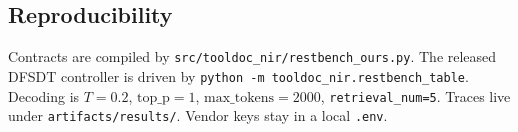 \documentclass[11pt,a4paper]{article}
\begin{document}
\subsection{Reproducibility}

Contracts are compiled by \texttt{src/tooldoc\_nir/restbench\_ours.py}.
The released DFSDT controller is driven by \texttt{python -m tooldoc\_nir.restbench\_table}.
Decoding is $T{=}0.2$, $\mathrm{top\_p}{=}1$, $\mathrm{max\_tokens}{=}2000$, \texttt{retrieval\_num=5}.
Traces live under \texttt{artifacts/results/}. Vendor keys stay in a local \texttt{.env}.
\end{document}
